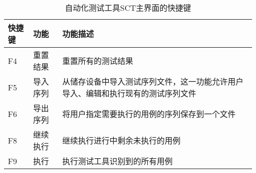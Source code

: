 		\begin{table}[H]
			\centering
			\caption{自动化测试工具SCT主界面的快捷键}
			\label{tab:自动化测试工具SCT主界面的快捷键}
			\begin{center}
			\begin{tabular}{|l|l|p{10cm}|} 
			\hline
			快捷键 & 功能 & 功能描述 \\ \hline
			F4 & 重置结果 & 重置所有的测试结果 \\ \hline
			F5 & 导入序列 & 从储存设备中导入测试序列文件，这一功能允许用户导入、编辑和执行现有的测试序列文件 \\ \hline
			F6 & 导出序列 & 将用户指定需要执行的用例的序列保存到一个文件 \\ \hline
			F8 & 继续执行 & 继续执行进行中剩余未执行的用例 \\ \hline
			F9 & 执行 & 执行测试工具识别到的所有用例 \\ \hline
			\end{tabular}
			\end{center}
		\end{table}

